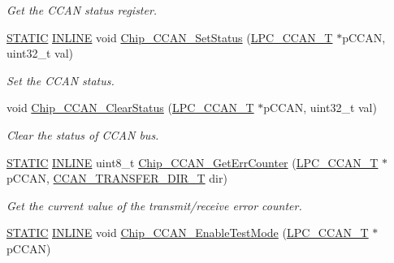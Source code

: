 \begin{DoxyCompactItemize}
\begin{DoxyCompactList}\small\item\em Get the C\+C\+AN status register. \end{DoxyCompactList}\item 
\hyperlink{group___l_p_c___types___public___macros_ga10b2d890d871e1489bb02b7e70d9bdfb}{S\+T\+A\+T\+IC} \hyperlink{spifi__18xx__43xx_8h_a2eb6f9e0395b47b8d5e3eeae4fe0c116}{I\+N\+L\+I\+NE} void \hyperlink{group___c_c_a_n__18_x_x__43_x_x_ga005c87851b2e901216b170b46e08861c}{Chip\+\_\+\+C\+C\+A\+N\+\_\+\+Set\+Status} (\hyperlink{struct_l_p_c___c_c_a_n___t}{L\+P\+C\+\_\+\+C\+C\+A\+N\+\_\+T} $\ast$p\+C\+C\+AN, uint32\+\_\+t val)
\begin{DoxyCompactList}\small\item\em Set the C\+C\+AN status. \end{DoxyCompactList}\item 
void \hyperlink{group___c_c_a_n__18_x_x__43_x_x_gad4ec595674d4ae4f357abf9df843fd7a}{Chip\+\_\+\+C\+C\+A\+N\+\_\+\+Clear\+Status} (\hyperlink{struct_l_p_c___c_c_a_n___t}{L\+P\+C\+\_\+\+C\+C\+A\+N\+\_\+T} $\ast$p\+C\+C\+AN, uint32\+\_\+t val)
\begin{DoxyCompactList}\small\item\em Clear the status of C\+C\+AN bus. \end{DoxyCompactList}\item 
\hyperlink{group___l_p_c___types___public___macros_ga10b2d890d871e1489bb02b7e70d9bdfb}{S\+T\+A\+T\+IC} \hyperlink{spifi__18xx__43xx_8h_a2eb6f9e0395b47b8d5e3eeae4fe0c116}{I\+N\+L\+I\+NE} uint8\+\_\+t \hyperlink{group___c_c_a_n__18_x_x__43_x_x_gaf986db27eac49a8f9042584e86c7dd6f}{Chip\+\_\+\+C\+C\+A\+N\+\_\+\+Get\+Err\+Counter} (\hyperlink{struct_l_p_c___c_c_a_n___t}{L\+P\+C\+\_\+\+C\+C\+A\+N\+\_\+T} $\ast$p\+C\+C\+AN, \hyperlink{group___c_c_a_n__18_x_x__43_x_x_gac400be6c4ae22b8b773b0bea6e9c5f02}{C\+C\+A\+N\+\_\+\+T\+R\+A\+N\+S\+F\+E\+R\+\_\+\+D\+I\+R\+\_\+T} dir)
\begin{DoxyCompactList}\small\item\em Get the current value of the transmit/receive error counter. \end{DoxyCompactList}\item 
\hyperlink{group___l_p_c___types___public___macros_ga10b2d890d871e1489bb02b7e70d9bdfb}{S\+T\+A\+T\+IC} \hyperlink{spifi__18xx__43xx_8h_a2eb6f9e0395b47b8d5e3eeae4fe0c116}{I\+N\+L\+I\+NE} void \hyperlink{group___c_c_a_n__18_x_x__43_x_x_ga8fdfcf8865fca9748ae26a391842e720}{Chip\+\_\+\+C\+C\+A\+N\+\_\+\+Enable\+Test\+Mode} (\hyperlink{struct_l_p_c___c_c_a_n___t}{L\+P\+C\+\_\+\+C\+C\+A\+N\+\_\+T} $\ast$p\+C\+C\+AN)

\end{DoxyCompactItemize}
